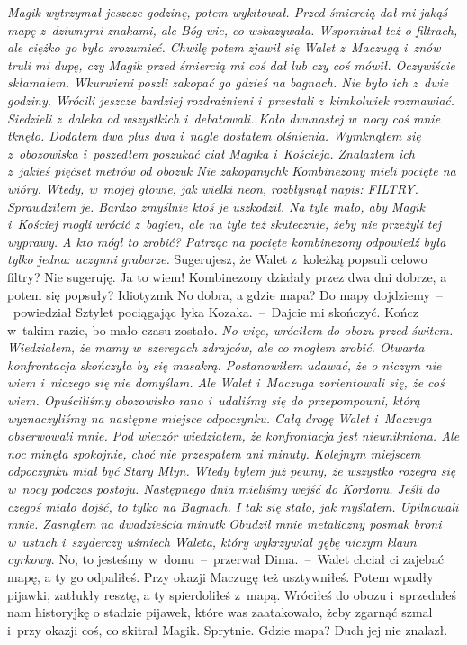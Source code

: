 \documentclass[../MAIN.tex]{subfiles}
\begin{document}
\textsl{
Magik wytrzymał jeszcze godzinę, potem wykitował. Przed śmiercią dał mi jakąś mapę z~dziwnymi znakami, ale Bóg wie, co wskazywała. Wspominał też o filtrach, ale ciężko go było zrozumieć. Chwilę potem zjawił się Walet z~Maczugą i~znów truli mi dupę, czy Magik przed śmiercią mi coś dał lub czy coś mówił. Oczywiście skłamałem. Wkurwieni poszli zakopać go gdzieś na bagnach. Nie było ich z~dwie godziny. Wrócili jeszcze bardziej rozdrażnieni i~przestali z~kimkolwiek rozmawiać. Siedzieli z~daleka od wszystkich i~debatowali. Koło dwunastej w~nocy coś mnie tknęło. Dodałem dwa plus dwa i~nagle dostałem olśnienia. Wymknąłem się z~obozowiska i~poszedłem poszukać ciał Magika i~Kościeja. Znalazłem ich z~jakieś pięćset metrów od obozu\3k Nie zakopanych\3k Kombinezony mieli pocięte na wióry. Wtedy, w~mojej głowie, jak wielki neon, rozbłysnął napis: \mbox{FILTRY}. Sprawdziłem je. Bardzo zmyślnie ktoś je uszkodził. Na tyle mało, aby Magik i~Kościej mogli wrócić z~bagien, ale na tyle też skutecznie, żeby nie przeżyli tej
wyprawy. A
kto mógł to zrobić? Patrząc na pocięte kombinezony odpowiedź była tylko jedna: uczynni grabarze.
}
\sx Sugerujesz, że Walet z~koleżką popsuli celowo filtry?
\xx Nie sugeruję. Ja to wiem! Kombinezony działały przez dwa dni dobrze, a potem się popsuły? Idiotyzm\3k
\xx No dobra, a gdzie mapa?
\xx Do mapy dojdziemy~--~powiedział Sztylet pociągając łyka Kozaka.~--~Dajcie mi skończyć.
\xx Kończ w~takim razie, bo mało czasu zostało.
\qm
\textsl{No więc, wróciłem do obozu przed świtem. Wiedziałem, że mamy w~szeregach zdrajców, ale co mogłem zrobić. Otwarta konfrontacja skończyła by się masakrą. Postanowiłem udawać, że o niczym nie wiem i~niczego się nie domyślam. Ale Walet i~Maczuga zorientowali się, że coś wiem. Opuściliśmy obozowisko rano i~udaliśmy się do przepompowni, którą wyznaczyliśmy na następne miejsce odpoczynku. Całą drogę Walet i~Maczuga obserwowali mnie. Pod wieczór wiedziałem, że konfrontacja jest nieunikniona. Ale noc minęła spokojnie, choć nie przespałem ani minuty. Kolejnym miejscem odpoczynku miał być Stary Młyn. Wtedy byłem już pewny, że wszystko rozegra się w~nocy podczas postoju. Następnego dnia mieliśmy wejść do Kordonu. Jeśli do czegoś miało dojść, to tylko na Bagnach. I tak się stało, jak myślałem. Upilnowali mnie. Zasnąłem na dwadzieścia minut\3k Obudził mnie metaliczny posmak broni w~ustach i~szyderczy uśmiech Waleta, który wykrzywiał gębę niczym klaun cyrkowy}.%
%
\sx No, to jesteśmy w~domu~--~przerwał Dima.~--~Walet chciał ci zajebać mapę, a ty go odpaliłeś. Przy okazji Maczugę też usztywniłeś. Potem wpadły pijawki, zatłukły resztę, a ty spierdoliłeś z~mapą. Wróciłeś do obozu i~sprzedałeś nam historyjkę o stadzie pijawek, które was zaatakowało, żeby zgarnąć szmal i~przy okazji coś, co skitrał Magik. Sprytnie. Gdzie mapa? Duch jej nie znalazł.
\end{document}
